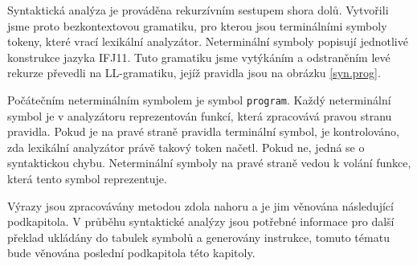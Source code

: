 Syntaktická analýza je prováděna rekurzívním sestupem shora dolů. Vy\-tvo\-ři\-li jsme proto bezkontextovou gramatiku, pro kterou jsou terminálními symboly tokeny, které vrací lexikální analyzátor. Neterminální symboly popisují jednotlivé konstrukce jazyka IFJ11. Tuto gramatiku jsme vytýkáním a od\-stra\-ně\-ním levé rekurze převedli na LL-gramatiku, jejíž pravidla jsou na obrázku \ref{syn.prog}.

Počátečním neterminálním symbolem je symbol {\tt program}. Každý neterminální symbol je v analyzátoru reprezentován funkcí, která zpracovává pravou stranu pravidla. Pokud je na pravé straně pravidla terminální symbol, je kontrolováno, zda lexikální analyzátor právě takový token načetl. Pokud ne, jedná se o syntaktickou chybu. Neterminální symboly na pravé straně vedou k volání funkce, která tento symbol reprezentuje.



Výrazy jsou zpracovávány metodou zdola nahoru a je jim věnována následující podkapitola. V průběhu syntaktické analýzy jsou potřebné informace pro další překlad ukládány do tabulek symbolů a generovány instrukce, tomuto tématu bude věnována poslední podkapitola této kapitoly.
